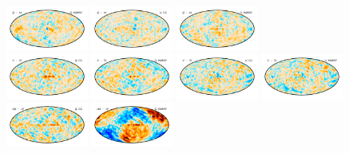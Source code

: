 \documentclass[twocolumn]{../../common/aa}
\begin{document}
\begin{figure}
	\includegraphics[width=0.24\textwidth]{figures/44Q_W_deltaQ.pdf}
	\includegraphics[width=0.24\textwidth]{figures/44Q_deltaU.pdf}
	\includegraphics[width=0.24\textwidth]{figures/44Q_W_deltaU.pdf}\\
	\includegraphics[width=0.24\textwidth]{figures/70V_deltaQ.pdf}
	\includegraphics[width=0.24\textwidth]{figures/70V_W_deltaQ.pdf}
	\includegraphics[width=0.24\textwidth]{figures/70V_deltaU.pdf}
	\includegraphics[width=0.24\textwidth]{figures/70V_W_deltaU.pdf}\\
	\includegraphics[width=0.24\textwidth]{figures/100W_deltaQ.pdf}
	\includegraphics[width=0.24\textwidth]{figures/100W_W_deltaQ.pdf}

\end{figure}
\end{document}
